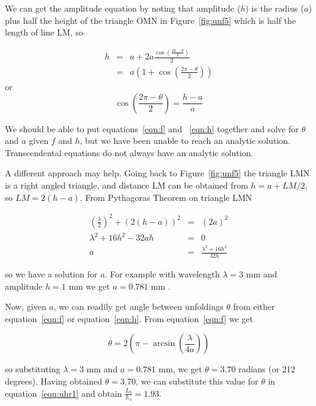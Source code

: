 \documentclass[titlepage,10pt]{article}  %
\begin{document}
We can get the amplitude equation by noting that amplitude ($h$) is the radius ($a$) plus half the height of the triangle OMN in Figure~\ref{fig:unf5} which is half the length of line LM, so

\begin{eqnarray*}
h & = & a  + 2a\frac{\cos\left(\frac{2 \pi - \theta}{2}\right)}{2} \\
  & = & a \left( 1 + \cos\left(\frac{2 \pi - \theta}{2}\right) \right)
\end{eqnarray*}
or 
\begin{equation}
\label{eqn:h}
\cos\left(\frac{2 \pi - \theta}{2}\right) = \frac{h-a}{a}
\end{equation}

We should be able to put equations~\ref{eqn:f} and ~\ref{eqn:h} together and solve for $\theta$ and $a$ given $f$ and $h$, but we have been unable to reach an analytic solution.  Transcendental equations do not always have an analytic solution.

A different approach may help. Going back to Figure~\ref{fig:unf5} the triangle LMN is a right angled triangle, and distance LM can be obtained from $h = a + LM/2$, so $LM = 2(h-a)$. From Pythagoras Theorem on triangle LMN

\begin{eqnarray*}
\left(\frac{\lambda}{2}\right)^{2} + \left(2(h-a)\right)^{2} & = & \left( 2a \right)^2 \\
\lambda^{2} + 16h^{2} - 32 a h  & = & 0 \\
a & = & \frac{\lambda^{2} + 16h^{2}}{32h}
\end{eqnarray*}

so we have a solution for $a$.
  For example with wavelength $\lambda=3$ mm and amplitude $h = 1$ mm  we get $ a = 0.781$ mm .

Now, given $a$, we can readily get angle between unfoldings $\theta$ from either equation~\ref{eqn:f} or equation~\ref{eqn:h}. From equation~\ref{eqn:f} we get

\begin{equation}
\label{eqn:t1}
\theta = 2 \left( \pi - \arcsin\left(\frac{\lambda}{4a}\right) \right)
\end{equation}

so substituting $\lambda = 3$ mm and $a = 0.781$ mm, we get $\theta = 3.70$ radians (or 212 degrees). Having obtained $\theta = 3.70$, we can substitute this value for $\theta$ in equation~\ref{eqn:uhr1} and obtain $\frac{L_{b}}{L_{s}} = 1.93$.
\end{document}
